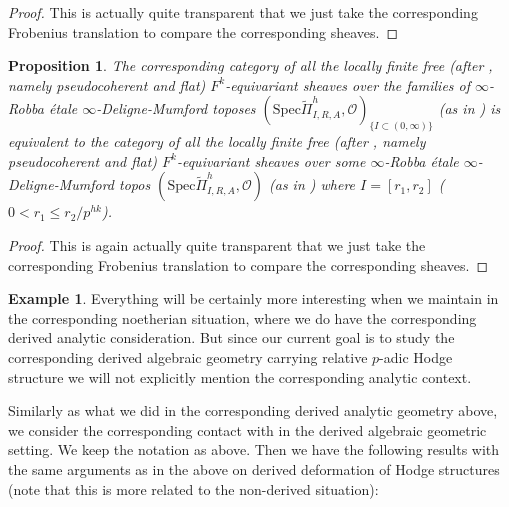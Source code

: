 \documentclass[12pt]{amsart}
\newtheorem{proposition}[theorem]{Proposition}
\theoremstyle{definition}
\numberwithin{equation}{section}
\newtheorem{example}[theorem]{Example}
\begin{document}
\begin{proof}
This is actually quite transparent that we just take the corresponding Frobenius translation to compare the corresponding sheaves.	
\end{proof}


\begin{proposition}
The corresponding category of all the locally finite free (after \cite[Section 7.2.2, 7.2.4]{Lu1}, namely pseudocoherent and flat) $F^k$-equivariant sheaves over the families of $\infty$-Robba \'etale $\infty$-Deligne-Mumford toposes $(\mathrm{Spec}\widetilde{\Pi}^h_{I,R,A},\mathcal{O})_{\{I \subset (0,\infty)\}}$ (as in \cite[Chapter 1.4]{Lu2}) is equivalent to the category of all the locally finite free (after \cite[Section 7.2.2, 7.2.4]{Lu1}, namely pseudocoherent and flat) $F^k$-equivariant sheaves over some $\infty$-Robba \'etale $\infty$-Deligne-Mumford topos $(\mathrm{Spec}\widetilde{\Pi}^h_{I,R,A},\mathcal{O})$ (as in \cite[Chapter 1.4]{Lu2}) where $I=[r_1,r_2]$ ($0<r_1\leq r_2/p^{hk}$).	
\end{proposition}


\begin{proof}
This is again actually quite transparent that we just take the corresponding Frobenius translation to compare the corresponding sheaves.	
\end{proof}




\begin{example}
Everything will be certainly more interesting when we maintain in the corresponding noetherian situation, where we do have the corresponding derived analytic consideration. But since our current goal is to study the corresponding derived algebraic geometry carrying relative $p$-adic Hodge structure we will not explicitly mention the corresponding analytic context.	
\end{example}







\indent Similarly as what we did in the corresponding derived analytic geometry above, we consider the corresponding contact with \cite{GV} in the derived algebraic geometric setting. We keep the notation as above. Then we have the following results with the same arguments as in the above on derived deformation of Hodge structures (note that this is more related to the non-derived situation):
\end{document}
